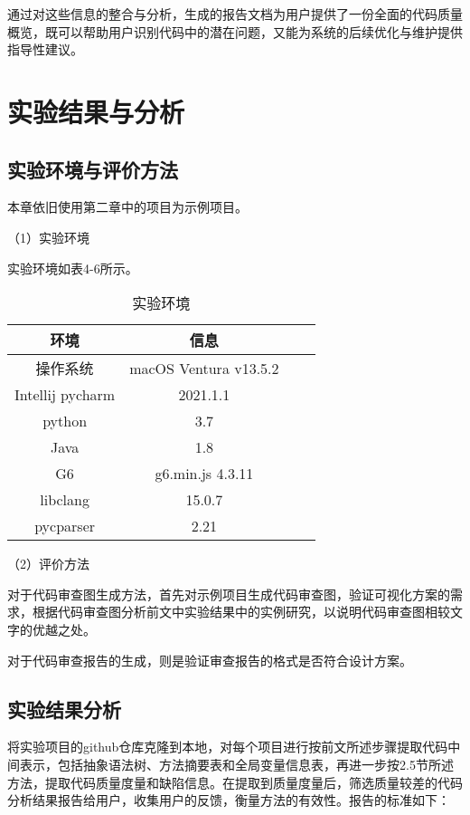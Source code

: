 通过对这些信息的整合与分析，生成的报告文档为用户提供了一份全面的代码质量概览，既可以帮助用户识别代码中的潜在问题，又能为系统的后续优化与维护提供指导性建议。

\section{实验结果与分析}

\subsection{实验环境与评价方法}

本章依旧使用第二章中的项目为示例项目。

（1）实验环境

实验环境如表4-6所示。

\begin{table}[htbp]
\caption{实验环境}
\vspace{0.5em}\centering\wuhao
\begin{tabular}{cccc}
\toprule
    环境 & 信息 \\
\midrule
操作系统 & macOS Ventura v13.5.2  \\
Intellij pycharm & 2021.1.1   \\
python & 3.7   \\
Java & 1.8   \\
G6 & g6.min.js 4.3.11  \\  
libclang & 15.0.7  \\ 
pycparser & 2.21  \\
\bottomrule
\end{tabular}
\end{table}



（2）评价方法


对于代码审查图生成方法，首先对示例项目生成代码审查图，验证可视化方案的需求，根据代码审查图分析前文中实验结果中的实例研究，以说明代码审查图相较文字的优越之处。

对于代码审查报告的生成，则是验证审查报告的格式是否符合设计方案。

\subsection{实验结果分析}


将实验项目的github仓库克隆到本地，对每个项目进行按前文所述步骤提取代码中间表示，包括抽象语法树、方法摘要表和全局变量信息表，再进一步按2.5节所述方法，提取代码质量度量和缺陷信息。在提取到质量度量后，筛选质量较差的代码分析结果报告给用户，收集用户的反馈，衡量方法的有效性。报告的标准如下：

